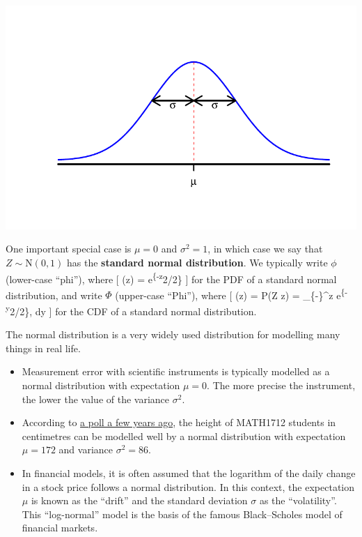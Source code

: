 \documentclass[
  letterpaper,
  DIV=11,
  numbers=noendperiod]{scrreprt}
\providecommand{\tightlist}{%
  \setlength{\itemsep}{0pt}\setlength{\parskip}{0pt}}\usepackage{longtable,booktabs,array}
\theoremstyle{remark}
\begin{document}
\includegraphics{sections/L17-normal_files/figure-pdf/norm-pic-2-1.pdf}

One important special case is \(\mu = 0\) and \(\sigma^2 = 1\), in which
case we say that \(Z \sim \mathrm N(0,1)\) has the \textbf{standard
normal distribution}. We typically write \(\phi\) (lower-case ``phi''),
where {[} \phi(z) = 
\mathrm e\textsuperscript{\{-z}2/2\} {]} for the PDF of a standard
normal distribution, and write \(\Phi\) (upper-case ``Phi''), where {[}
\Phi(z) = \mathbb P(Z \leq z) = 
\int\_\{-\infty\}\^{}z \mathrm e\textsuperscript{\{-y}2/2\}, \mathrm dy
{]} for the CDF of a standard normal distribution.

The normal distribution is a very widely used distribution for modelling
many things in real life.

\begin{itemize}
\tightlist
\item
  Measurement error with scientific instruments is typically modelled as
  a normal distribution with expectation \(\mu = 0\). The more precise
  the instrument, the lower the value of the variance \(\sigma^2\).
\item
  According to
  \href{http://www1.maths.leeds.ac.uk/~voss/2019/MATH1712/index.html}{a
  poll a few years ago}, the height of MATH1712 students in centimetres
  can be modelled well by a normal distribution with expectation
  \(\mu = 172\) and variance \(\sigma^2 = 86\).
\item
  In financial models, it is often assumed that the logarithm of the
  daily change in a stock price follows a normal distribution. In this
  context, the expectation \(\mu\) is known as the ``drift'' and the
  standard deviation \(\sigma\) as the ``volatility''. This
  ``log-normal'' model is the basis of the famous Black--Scholes model
  of financial markets.
\end{itemize}
\end{document}
